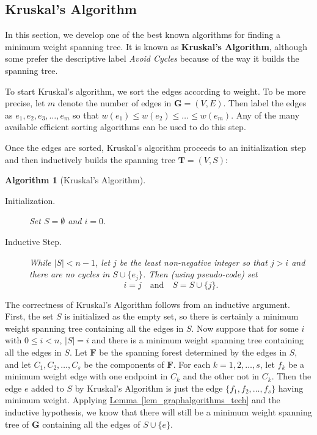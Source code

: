\documentclass[10pt,]{book}
\newcommand{\terminology}[1]{\textbf{#1}}
\theoremstyle{plain}
\newtheorem{algorithm}[theorem]{Algorithm}
\theoremstyle{definition}
\theoremstyle{definition}
\theoremstyle{definition}
\theoremstyle{definition}
\numberwithin{equation}{section}
\newcommand{\GVE}{\mathbf{G}=(V,E)}
\newcommand{\bfG}{\mathbf{G}}
\newcommand{\bfF}{\mathbf{F}}
\newcommand{\bfT}{\mathbf{T}}
\newcommand{\lt}{<}
\begin{document}
\subsection[{Kruskal's Algorithm}]{Kruskal's Algorithm}\label{subsection-20}
\hypertarget{p-168}{}%
In this section, we develop one of the best known algorithms for finding a minimum weight spanning tree. It is known as \terminology{Kruskal's Algorithm}, although some prefer the descriptive label \emph{Avoid Cycles} because of the way it builds the spanning tree.%
\par
\hypertarget{p-169}{}%
To start Kruskal's algorithm, we sort the edges according to weight.  To be more precise, let \(m\) denote the number of edges in \(\GVE\).  Then label the edges as \(e_1,e_2,e_3,\dots,e_m\) so that \(w(e_1)\le w(e_2)\le \dots \le w(e_m)\). Any of the many available efficient sorting algorithms can be used to do this step.%
\par
\hypertarget{p-170}{}%
Once the edges are sorted, Kruskal's algorithm proceeds to an initialization step and then inductively builds the spanning tree \(\bfT=(V,S)\):%
\begin{algorithm}[{Kruskal's Algorithm}]\label{alg_kruskal}
\hypertarget{p-171}{}%
\leavevmode%
\begin{description}
\item[{Initialization.}]\hypertarget{li-43}{}\hypertarget{p-172}{}%
Set \(S=\emptyset\) and \(i=0\).%
\item[{Inductive Step.}]\hypertarget{li-44}{}\hypertarget{p-173}{}%
While \(|S| \lt n-1\), let \(j\) be the least non-negative integer so that \(j > i\) and there are no cycles in \(S\cup\{e_j\}\). Then (using pseudo-code) set%
\begin{equation*}
i = j\quad\text{and} \quad S= S\cup\{j\}.
\end{equation*}
%
\end{description}
%
\end{algorithm}
\hypertarget{p-174}{}%
The correctness of Kruskal's Algorithm follows from an inductive argument. First, the set \(S\) is initialized as the empty set, so there is certainly a minimum weight spanning tree containing all the edges in \(S\). Now suppose that for some \(i\) with \(0\le i \lt n\), \(|S|=i\) and there is a minimum weight spanning tree containing all the edges in \(S\). Let \(\bfF\) be the spanning forest determined by the edges in \(S\), and let \(C_1, C_2,\dots,C_s\) be the components of \(\bfF\). For each \(k=1,2,\dots,s\), let \(f_k\) be a minimum weight edge with one endpoint in \(C_k\) and the other not in \(C_k\). Then the edge \(e\) added to \(S\) by Kruskal's Algorithm is just the edge \(\{f_1,f_2,\dots,f_s\}\) having minimum weight. Applying \hyperref[lem_graphalgorithms_tech]{Lemma~\ref{lem_graphalgorithms_tech}} and the inductive hypothesis, we know that there will still be a minimum weight spanning tree of \(\bfG\) containing all the edges of \(S\cup\{e\}\).%
\end{document}

